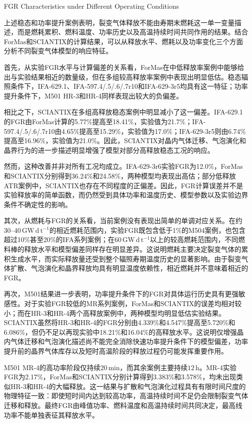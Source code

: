 {FGR Characteristics under Different Operating Conditions}

上述稳态和功率提升案例表明，裂变气体释放不能由寿期末燃耗这一单一变量描述，而是燃耗累积、燃料温度、功率历史以及高温持续时间共同作用的结果。结合ForMas和SCIANTIX的计算结果，可以从释放水平、燃耗以及功率变化三个方面分析不同裂变气体模型的响应特征。

首先，从实验FGR水平与计算偏差的关系看，ForMas在中低释放率案例中能够给出与实验结果相近的数量级，但在多组较高释放率案例中表现出明显低估。稳态辐照条件下，IFA-629.1、IFA-597.4/.5/.6/.7r10和IFA-629-3r5均具有这一特征；功率提升条件下，M501 HR-3和HR-4同样表现出较大的负偏差。

相比之下，SCIANTIX在多组高释放稳态案例中明显减小了这一偏差。IFA-629.1的FGR由ForMas计算的5.77\%提高至18.41\%，实验值为21.7\%；IFA-597.4/.5/.6/.7r10由4.65\%提高至15.29\%，实验值为17.0\%；IFA-629-3r5则由6.74\%提高至16.96\%，实验值为21.0\%。因此，SCIANTIX对晶内气体迁移、气泡演化和晶界行为的进一步描述明显增强了模型对部分高释放稳态工况的响应。

然而，这种改善并非对所有工况均成立。IFA-629-3r6实验FGR为12.0\%，ForMas和SCIANTIX分别得到36.24\%和24.58\%，两种模型均表现出高估；部分低释放ATR案例中，SCIANTIX也存在不同程度的正偏差。因此，FGR计算误差并不是实验释放率的简单函数，而仍然受到具体功率和温度历史、模型参数以及实验边界条件不确定性的影响。

其次，从燃耗与FGR的关系看，当前案例没有表现出简单的单调对应关系。在约$30$--$40\,\mathrm{GW\,d\,t^{-1}}$的相近燃耗范围内，实验FGR既包含低于1\%的M504案例，也包含超过10\%甚至20\%的IFA系列案例；在$60\,\mathrm{GW\,d\,t^{-1}}$以上的较高燃耗范围内，不同燃料棒的释放水平和模型偏差同样存在明显差异。这说明燃耗主要决定裂变气体的累积生成水平，而实际释放量还受到整个辐照寿期温度历史的显著影响。由于裂变气体扩散、气泡演化和晶界释放均具有明显温度依赖性，相近燃耗并不意味着相近的FGR。

再次，M501结果进一步表明，功率提升条件下的FGR对具体运行历史具有更强敏感性。对于实验FGR较低的MR系列案例，ForMas和SCIANTIX的误差均相对较小；而在HR-3和HR-4两个高释放案例中，两种模型均明显低估实验结果。SCIANTIX虽然将HR-3和HR-4的FGR分别由4.339\%和4.547\%提高至5.720\%和6.086\%，但仍不足以再现实验中18.21\%和16.04\%的高释放水平。这说明仅增强晶内气体迁移和气泡演化描述尚不能完全消除快速功率提升条件下的模型偏差，功率提升前的晶界气体库存以及短时高温阶段的释放过程仍可能发挥重要作用。

M501 MR-4的高功率阶段仅持续$20\,\mathrm{min}$，而其余案例主要持续$12\,\mathrm{h}$。MR-4实验FGR为2.17\%，ForMas和SCIANTIX分别计算得到3.383\%和3.578\%，均未出现类似HR-3和HR-4的大幅释放。这一结果与扩散和气泡演化过程具有有限时间尺度的物理特征一致：即使短时间内达到较高功率，高温持续时间不足仍会限制裂变气体迁移和释放。最终FGR由峰值功率、燃料温度和高温持续时间共同决定，最高线功率不能单独表征其释放水平。

